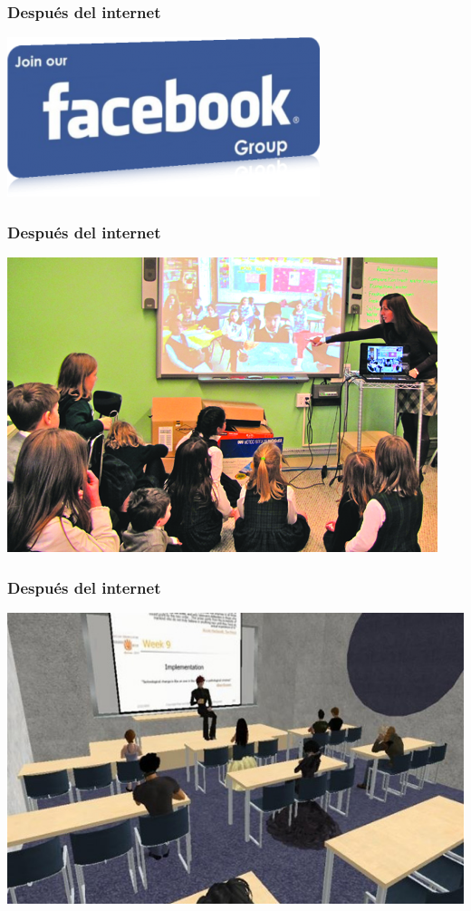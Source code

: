 \documentclass{beamer}
\begin{document}
\begin{frame}
	\frametitle{Después del internet}

	\begin{center}
		\includegraphics[width=.9\textwidth]{figures/Facebook-Groups.png}
	\end{center}
\end{frame}

\begin{frame}
	\frametitle{Después del internet}

	\begin{center}
		\includegraphics[width=.9\textwidth]{figures/skype.jpg}
	\end{center}
\end{frame}

\begin{frame}
	\frametitle{Después del internet}

	\begin{center}
		\includegraphics[width=.9\textwidth]{figures/second-life.jpg}
	\end{center}
\end{frame}
\end{document}
